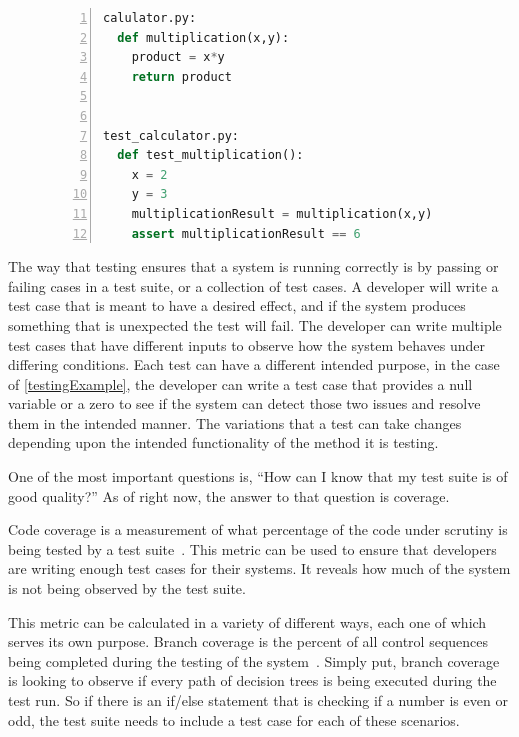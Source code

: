\begin{figure}[t!]
\begin{lstlisting}[language = Python, numbers = left, frame = single, caption = Example of a unit test in the Pytest~\cite{okken_2018} framework., label = testingExample]
calulator.py:
  def multiplication(x,y):
    product = x*y
    return product


test_calculator.py:
  def test_multiplication():
    x = 2
    y = 3
    multiplicationResult = multiplication(x,y)
    assert multiplicationResult == 6
\end{lstlisting}
\end{figure}

The way that testing ensures that a system is running correctly is by passing or failing cases in a test suite, or a collection of test cases. A developer will write a test case that is meant to have a desired effect, and if the system produces something that is unexpected the test will fail. The developer can write multiple test cases that have different inputs to observe how the system behaves under differing conditions. Each test can have a different intended purpose, in the case of \ref{testingExample}, the developer can write a test case that provides a null variable or a zero to see if the system can detect those two issues and resolve them in the intended manner. The variations that a test can take changes depending upon the intended functionality of the method it is testing.

One of the most important questions is, ``How can I know that my test suite is of good quality?'' As of right now, the answer to that question is coverage.

Code coverage is a measurement of what percentage of the code under scrutiny is being tested by a test suite~\cite{okken_2018}. This metric can be used to ensure that developers are writing enough test cases for their systems. It reveals how much of the system is not being observed by the test suite.

This metric can be calculated in a variety of different ways, each one of which serves its own purpose.
Branch coverage is the  percent of all control sequences being completed during the testing of the system~\cite{zhu1997software}. Simply put, branch coverage is looking to observe if every path of decision trees is being executed during the test run. So if there is an if/else statement that is checking if a number is even or odd, the test suite needs to include a test case for each of these scenarios.

